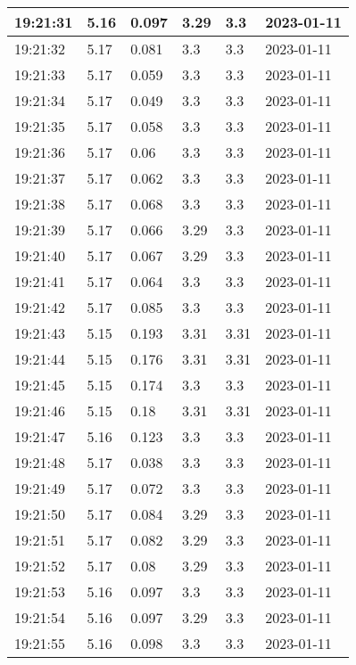 \begin{longtable}{|l|l|l|l|l|l|}
        19:21:31 & 5.16 & 0.097 & 3.29 & 3.3 & 2023-01-11 \\ \hline
        19:21:32 & 5.17 & 0.081 & 3.3 & 3.3 & 2023-01-11 \\ \hline
        19:21:33 & 5.17 & 0.059 & 3.3 & 3.3 & 2023-01-11 \\ \hline
        19:21:34 & 5.17 & 0.049 & 3.3 & 3.3 & 2023-01-11 \\ \hline
        19:21:35 & 5.17 & 0.058 & 3.3 & 3.3 & 2023-01-11 \\ \hline
        19:21:36 & 5.17 & 0.06 & 3.3 & 3.3 & 2023-01-11 \\ \hline
        19:21:37 & 5.17 & 0.062 & 3.3 & 3.3 & 2023-01-11 \\ \hline
        19:21:38 & 5.17 & 0.068 & 3.3 & 3.3 & 2023-01-11 \\ \hline
        19:21:39 & 5.17 & 0.066 & 3.29 & 3.3 & 2023-01-11 \\ \hline
        19:21:40 & 5.17 & 0.067 & 3.29 & 3.3 & 2023-01-11 \\ \hline
        19:21:41 & 5.17 & 0.064 & 3.3 & 3.3 & 2023-01-11 \\ \hline
        19:21:42 & 5.17 & 0.085 & 3.3 & 3.3 & 2023-01-11 \\ \hline
        19:21:43 & 5.15 & 0.193 & 3.31 & 3.31 & 2023-01-11 \\ \hline
        19:21:44 & 5.15 & 0.176 & 3.31 & 3.31 & 2023-01-11 \\ \hline
        19:21:45 & 5.15 & 0.174 & 3.3 & 3.3 & 2023-01-11 \\ \hline
        19:21:46 & 5.15 & 0.18 & 3.31 & 3.31 & 2023-01-11 \\ \hline
        19:21:47 & 5.16 & 0.123 & 3.3 & 3.3 & 2023-01-11 \\ \hline
        19:21:48 & 5.17 & 0.038 & 3.3 & 3.3 & 2023-01-11 \\ \hline
        19:21:49 & 5.17 & 0.072 & 3.3 & 3.3 & 2023-01-11 \\ \hline
        19:21:50 & 5.17 & 0.084 & 3.29 & 3.3 & 2023-01-11 \\ \hline
        19:21:51 & 5.17 & 0.082 & 3.29 & 3.3 & 2023-01-11 \\ \hline
        19:21:52 & 5.17 & 0.08 & 3.29 & 3.3 & 2023-01-11 \\ \hline
        19:21:53 & 5.16 & 0.097 & 3.3 & 3.3 & 2023-01-11 \\ \hline
        19:21:54 & 5.16 & 0.097 & 3.29 & 3.3 & 2023-01-11 \\ \hline
        19:21:55 & 5.16 & 0.098 & 3.3 & 3.3 & 2023-01-11 \\ \hline

\end{longtable}
